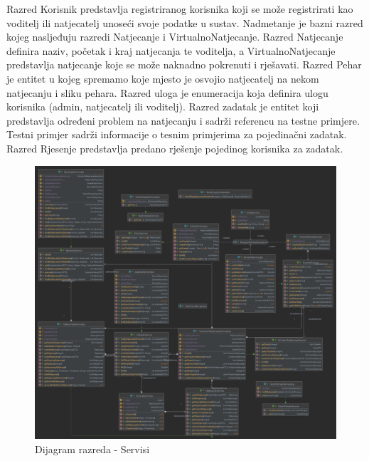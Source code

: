 Razred Korisnik predstavlja registriranog korisnika koji se može registrirati kao voditelj ili natjecatelj unoseći svoje podatke u sustav. Nadmetanje je bazni razred kojeg nasljeđuju razredi Natjecanje i VirtualnoNatjecanje.
Razred Natjecanje definira naziv, početak i kraj natjecanja te voditelja, a VirtualnoNatjecanje predstavlja natjecanje koje se može naknadno pokrenuti i rješavati. Razred Pehar je entitet u kojeg spremamo koje mjesto je osvojio natjecatelj na nekom natjecanju i sliku pehara.
Razred uloga je enumeracija koja definira ulogu korisnika (admin, natjecatelj ili voditelj). Razred zadatak je entitet koji predstavlja određeni problem na natjecanju i sadrži referencu na testne primjere.
Testni primjer sadrži informacije o tesnim primjerima za pojedinačni zadatak. Razred Rjesenje predstavlja predano rješenje pojedinog korisnika za zadatak. 

\begin{figure}[H]
	\includegraphics[scale=0.13]{dijagrami/serviceDiagram.png}
	\centering
	\caption{Dijagram razreda - Servisi}
	\label{fig:dijagramRazreda1}
\end{figure}

